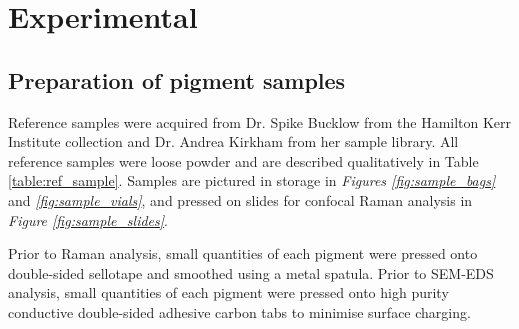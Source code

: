 
\chapter{Experimental}

\ifpdf
    \graphicspath{{Chapter2/Figs/Raster/}{Chapter2/Figs/PDF/}{Chapter2/Figs/}}
\else
    \graphicspath{{Chapter2/Figs/Vector/}{Chapter2/Figs/}}
\fi


\section[Preparation of samples]{Preparation of pigment samples}
\label{section2.1}

Reference samples were acquired from Dr. Spike Bucklow from the Hamilton Kerr Institute collection and Dr. Andrea Kirkham from her sample library. All reference samples were loose powder and are described qualitatively in Table \ref{table:ref_sample}. Samples are pictured in storage in \textit{Figures \ref{fig:sample_bags}} and \textit{\ref{fig:sample_vials}}, and pressed on slides for confocal Raman analysis in \textit{Figure \ref{fig:sample_slides}}.

Prior to Raman analysis, small quantities of each pigment were pressed onto double-sided sellotape and smoothed using a metal spatula. Prior to SEM-EDS analysis, small quantities of each pigment were pressed onto high purity conductive double-sided adhesive carbon tabs to minimise surface charging.

